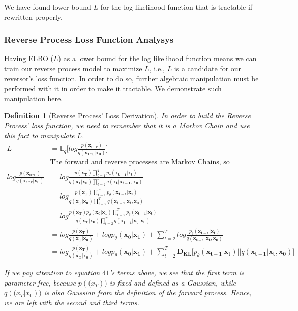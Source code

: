 \documentclass{article}
\newtheorem{definition}{Definition}[section]
\begin{document}
We have found lower bound $L$ for the log-likelihood function that is tractable if rewritten properly.

\subsubsection{Reverse Process Loss Function Analysys}

Having ELBO ($L$) as a lower bound for the log likelihood function means we can train our reverse process model to maximize $L$, i.e., $L$ is a candidate for our reversor's loss function. In order to do so, further algebraic manipulation must be performed with it in order to make it tractable. We demonstrate such manipulation here.

\begin{definition}[Reverse Process' Loss Derivation]
	In order to build the Reverse Process' loss function, we need to remember that it is a Markov Chain and use this fact to manipulate $L$.
	\begin{align}
		L & =   \mathbb{E}_q\bigg[log \frac{p(\mathbf{x_{0:T}})} {q(\mathbf{x_{1:T}| x_0})}\bigg] \\
		& \text{The forward and reverse processes are Markov Chains, so} \\
		log \frac{p(\mathbf{x_{0:T}})} {q(\mathbf{x_{1:T}| x_0})} &= log \frac{p(\mathbf{x_{T}}) \prod_{t=1}^T p_\theta(\mathbf{x_{t-1} | x_t})} {q(\mathbf{x_1| x_0}) \prod_{t=2}^T q(\mathbf{x_{t} | x_{t-1}, x_0})} \\
		&= log \frac{p(\mathbf{x_{T}}) \prod_{t=1}^T p_\theta(\mathbf{x_{t-1} | x_t})} {q(\mathbf{x_T| x_0}) \prod_{t=2}^T q(\mathbf{x_{t-1} | x_t, x_0})} \\
		&= log \frac{p(\mathbf{x_{T}}) p_\theta(\mathbf{x_0 | x_1})\prod_{t=2}^T p_\theta(\mathbf{x_{t-1} | x_t})} {q(\mathbf{x_T| x_0}) \prod_{t=2}^T q(\mathbf{x_{t-1} | x_t, x_0})} \\
		&= log \frac{p(\mathbf{x_{T}})}{q(\mathbf{x_T| x_0})} + log p_\theta(\mathbf{x_0 | x_1}) + \sum_{t=2}^T log  \frac{p_\theta(\mathbf{x_{t-1} | x_t})} {q(\mathbf{x_{t-1} | x_t, x_0})}\\
		&= log \frac{p(\mathbf{x_{T}})}{q(\mathbf{x_T| x_0})} + log p_\theta(\mathbf{x_0 | x_1}) + \sum_{t=2}^T 	\mathbf{D_{KL}}\big[ p_\theta (\mathbf{x_{t-1} | x_t})  || q(\mathbf{x_{t-1} | x_t,  x_0}) \big]
	\end{align}

	If we pay attention to equation $41$'s terms above, we see that the first term is parameter free, because $p(\mathbf(x_T))$ is fixed and defined as a Gaussian, while $q(\mathbf(x_T | x_0))$ is also Gaussian from the definition of the forward process. Hence, we are left with the second and third terms. 
	

\end{definition}
\end{document}
